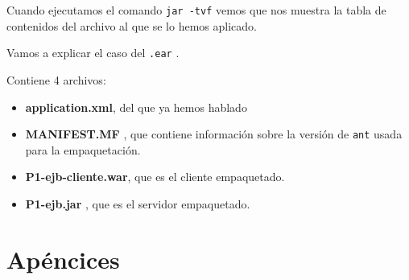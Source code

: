\documentclass[a4paper, 10pt]{article}
\begin{document}
 Cuando ejecutamos el comando \texttt{jar -tvf} vemos que nos muestra la tabla de contenidos del archivo al que se lo hemos aplicado.
 
 Vamos a explicar el caso del \texttt{.ear} .
 
 Contiene 4 archivos:
 \begin{itemize}
 	\item \textbf{application.xml}, del que ya hemos hablado
 	\item \textbf{MANIFEST.MF} , que contiene información sobre la versión de \texttt{ant} usada para la empaquetación.
 	\item \textbf{P1-ejb-cliente.war}, que es el cliente empaquetado.
 	\item \textbf{P1-ejb.jar} , que es el servidor empaquetado.
 \end{itemize} 
\newpage
\appendix
\section{Apéncices}
\end{document}

